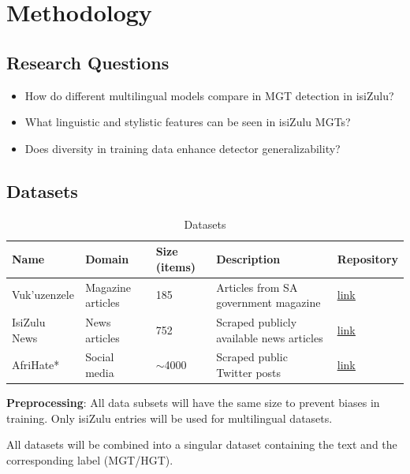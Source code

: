 \documentclass[11pt, a4paper,twocolumn]{article}
\begin{document}
    \section{Methodology}

\subsection{Research Questions}

\begin{itemize}
    \item How do different multilingual models compare in MGT detection in isiZulu?
    \item What linguistic and stylistic features can be seen in isiZulu MGTs?
    \item Does diversity in training data enhance detector generalizability?
\end{itemize}

\subsection{Datasets}

\begin{table}[tp]
\centering
\begin{tabular}{l l l >{\raggedright\arraybackslash}p{5cm} l}
\toprule
\textbf{Name} & \textbf{Domain} & \textbf{Size (items)} & \textbf{Description} & \textbf{Repository} \\
\midrule
Vuk'uzenzele 
    & Magazine articles 
    & 185 
    & Articles from SA government magazine 
    & \href{https://github.com/dsfsi/vukuzenzele-nlp}{\uline{link}} \\
IsiZulu News 
    & News articles 
    & 752 
    & Scraped publicly available news articles
    & \href{https://github.com/dsfsi/za-isizulu-siswati-news-2022}{\uline{link}} \\
AfriHate* 
    & Social media 
    & $\sim$4000 
    & Scraped public Twitter posts 
    & \href{https://github.com/AfriHate/AfriHate}{\uline{link}} \\
\bottomrule
\end{tabular}
\caption{Datasets}
\end{table}

\textbf{Preprocessing}: All data subsets will have the same size to prevent biases in training. Only isiZulu entries will be used for multilingual datasets.

All datasets will be combined into a singular dataset containing the text and the corresponding label (MGT/HGT).
\end{document}
